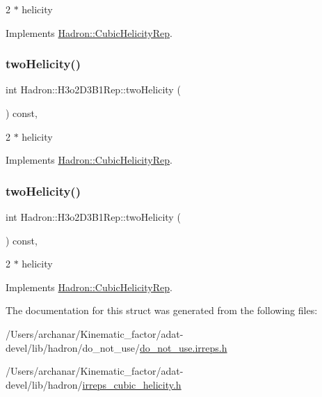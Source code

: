 2 $\ast$ helicity 

Implements \mbox{\hyperlink{structHadron_1_1CubicHelicityRep_af507aa56fc2747eacc8cb6c96db31ecc}{Hadron\+::\+Cubic\+Helicity\+Rep}}.

\mbox{\label{structHadron_1_1H3o2D3B1Rep_a1052c3969643f837adfe2d8df8e0b1ce}} 
\subsubsection{\texorpdfstring{twoHelicity()}{twoHelicity()}\hspace{0.1cm}{\footnotesize\ttfamily [2/3]}}
{\footnotesize\ttfamily int Hadron\+::\+H3o2\+D3\+B1\+Rep\+::two\+Helicity (\begin{DoxyParamCaption}{ }\end{DoxyParamCaption}) const\hspace{0.3cm}{\ttfamily [inline]}, {\ttfamily [virtual]}}

2 $\ast$ helicity 

Implements \mbox{\hyperlink{structHadron_1_1CubicHelicityRep_af507aa56fc2747eacc8cb6c96db31ecc}{Hadron\+::\+Cubic\+Helicity\+Rep}}.

\mbox{\label{structHadron_1_1H3o2D3B1Rep_a1052c3969643f837adfe2d8df8e0b1ce}} 
\subsubsection{\texorpdfstring{twoHelicity()}{twoHelicity()}\hspace{0.1cm}{\footnotesize\ttfamily [3/3]}}
{\footnotesize\ttfamily int Hadron\+::\+H3o2\+D3\+B1\+Rep\+::two\+Helicity (\begin{DoxyParamCaption}{ }\end{DoxyParamCaption}) const\hspace{0.3cm}{\ttfamily [inline]}, {\ttfamily [virtual]}}

2 $\ast$ helicity 

Implements \mbox{\hyperlink{structHadron_1_1CubicHelicityRep_af507aa56fc2747eacc8cb6c96db31ecc}{Hadron\+::\+Cubic\+Helicity\+Rep}}.



The documentation for this struct was generated from the following files\+:\begin{DoxyCompactItemize}
\item 
/\+Users/archanar/\+Kinematic\+\_\+factor/adat-\/devel/lib/hadron/do\+\_\+not\+\_\+use/\mbox{\hyperlink{adat-devel_2lib_2hadron_2do__not__use_2do__not__use_8irreps_8h}{do\+\_\+not\+\_\+use.\+irreps.\+h}}\item 
/\+Users/archanar/\+Kinematic\+\_\+factor/adat-\/devel/lib/hadron/\mbox{\hyperlink{adat-devel_2lib_2hadron_2irreps__cubic__helicity_8h}{irreps\+\_\+cubic\+\_\+helicity.\+h}}\end{DoxyCompactItemize}
